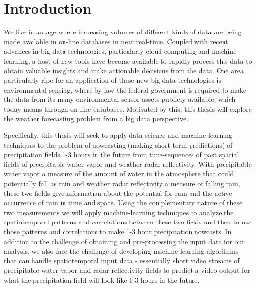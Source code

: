 \documentclass[proposal]{umassthesis}
\begin{document}
\tableofcontents                %
\listoftables                   %
\listoffigures                  %


\mainmatter   %


\chapter{Introduction}

We live in an age where increasing volumes of different kinds of data are being made available in on-line databases in near real-time. Coupled with recent advances in big data technologies, particularly cloud computing and machine learning, a host of new tools have become available to rapidly process this data to obtain valuable insights and make actionable decisions from the data. One area particularly ripe for an application of these new big data technologies is environmental sensing, where by law the federal government is required to make the data from its many environmental sensor assets publicly available, which today means through on-line databases. Motivated by this, this thesis will explore the weather forecasting problem from a big data perspective.

Specifically, this thesis will seek to apply data science and machine-learning techniques to the problem of nowcasting (making short-term predictions) of precipitation fields 1-3 hours in the future from time-sequences of past spatial fields of precipitable water vapor and weather radar reflectivity. With precipitable water vapor a measure of the amount of water in the atmosphere that could potentially fall as rain and weather radar reflectivity a measure of falling rain, these two fields give information about the potential for rain and the active occurrence of rain in time and space. Using the complementary nature of these two measurements we will apply machine-learning techniques to analyze the spatiotemporal patterns and correlations between these two fields and then to use those patterns and correlations to make 1-3 hour precipitation nowcasts. In addition to the challenge of obtaining and pre-processing the input data for our analysis, we also face the challenge of developing machine learning algorithms that can handle spatiotemporal input data - essentially short video streams of precipitable water vapor and radar reflectivity fields to predict a video output for what the precipitation field will look like 1-3 hours in the future.
\end{document}
